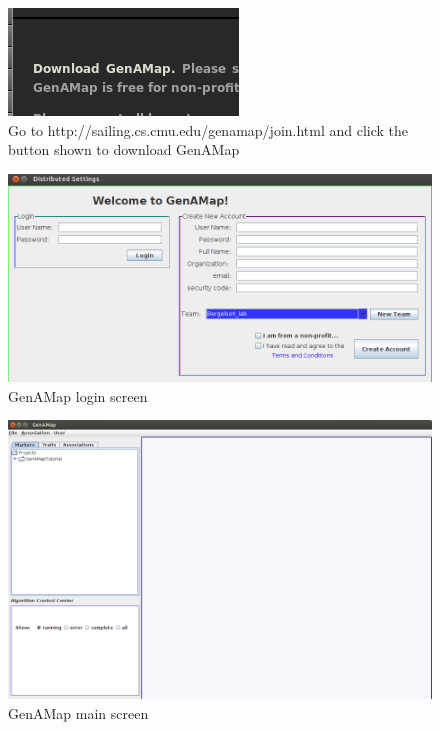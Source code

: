 \documentclass{article}
\begin{document}
\pagebreak
\clearpage

\begin{figure}
\includegraphics[width=\textwidth]{downloadButton.png}
\caption{Go to http://sailing.cs.cmu.edu/genamap/join.html and click the button shown to download GenAMap}
\label{downloadButton}
\end{figure}

\begin{figure}
\includegraphics[width=\textwidth]{loginScreen.png}
\caption{GenAMap login screen}
\label{loginScreen}
\end{figure}

\begin{figure}
\includegraphics[width=\textwidth]{initialScreen.png}
\caption{GenAMap main screen}
\label{initialScreen}
\end{figure}
\end{document}
